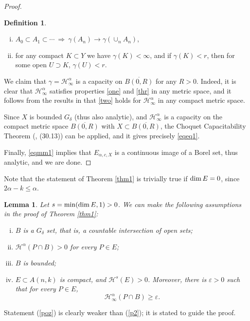 \documentclass[a4paper]{amsart}
\newtheorem{lemma}[theorem]{Lemma}
\theoremstyle{definition} \newtheorem{remark}[theorem]{Remark}
\newtheorem*{defin*}{Definition}
\def\su{\subset}
\def\sp{\supset}
\def\al{\alpha}
\def\ga{\gamma}
\def\ep{\varepsilon}
\def\ol{\overline}
\def\dim{{\rm dim}\, }
\def\hau{\mathcal{H}}
\begin{document}
\begin{proof}
\begin{defin*}
\begin{enumerate}[(i)]
	\item \label{two}
	$A_0 \su A_1 \su \cdots \ \Longrightarrow \  \ga(A_n) \to  \ga(\cup_n A_n)$,
	
	\item \label{thr}
	for any compact $K \su Y$ we have  $\ga(K) < \infty$, and if $\ga(K) < r$, then for some open $U \sp K$, $\ga(U) < r$. 
\end{enumerate}
\end{defin*}
We claim that $\ga=\hau^\alpha_\infty$ is a capacity on $\ol{B(0,R)}$ for any $R>0$. Indeed, it is clear that $\hau^\alpha_\infty$ satisfies 
properties \eqref{one} and \eqref{thr} in any metric space, 
and it follows from the results in \cite{Da} that \eqref{two} holds for $\hau^\alpha_\infty$ in any compact metric space. 

Since $X$ is bounded $G_\delta$ (thus also analytic), and $\hau^\alpha_\infty$ is a capacity on the compact metric space $\ol{B(0,R)}$ with 
$X \su \ol{B(0,R)}$, the Choquet Capacitability Theorem (\cite{Kec}, (30.13)) can be applied, and it gives precisely \eqref{eqeq1}. 

Finally, \eqref{eqmm1} implies that $E_{\alpha, c, X}$ is a continuous image of a Borel set, thus analytic, and we are done.
\end{proof}


Note that the statement of Theorem \ref{thm1} is trivially true if $\dim E=0$, since $2 \al-k \leq \al$.

\begin{lemma}\label{assump}
Let $s=\min (\dim E,1) >0$. 
\label{ass}
We can make the following assumptions in the proof of Theorem \ref{thm1}:
\begin{enumerate}[(i)]

\item\label{gdelta}
$B$ is a $G_\delta$ set, that is, a countable intersection of open sets;

\item\label{poz}
$\hau^\alpha(P\cap B)>0$ for every $P\in E$;

\item
\label{bounded}
$B$ is bounded;

\item
\label{comp}\label{p2}
$E \su A(n,k)$ is compact, and $\hau^s(E)>0$. Moreover,
there is $\ep>0$ such that for every $P\in E$,
$$\hau^{\al}_{\infty}(P \cap B) \ge \ep.$$


\end{enumerate}
\end{lemma} 
Statement (\ref{poz}) is clearly weaker than (\ref{p2}); it is stated
to guide the proof.
\end{document}
